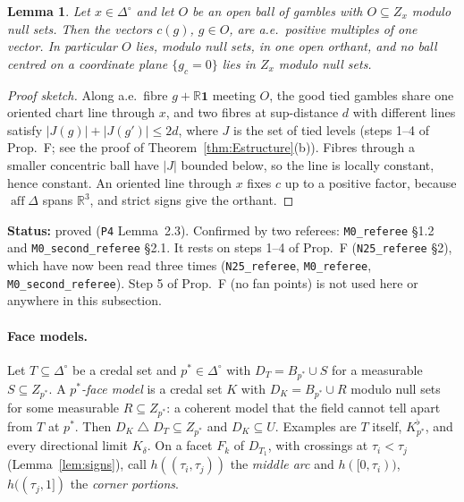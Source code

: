\documentclass[11pt]{article}
\newtheorem{lemma}[theorem]{Lemma}
\theoremstyle{definition}
\theoremstyle{remark}
\newcommand{\R}{\mathbb R}
\newcommand{\one}{\mathbf 1}
\newcommand{\Di}{\Delta^{\circ}}
\newcommand{\aff}{\operatorname{aff}}
\newcommand{\sd}{\mathbin{\triangle}}
\newcommand{\src}[1]{\texttt{#1}}
\newcommand{\status}[1]{\par\smallskip\noindent\textbf{Status:} #1\par\smallskip}
\begin{document}
\begin{lemma}\label{lem:ball}
Let $x\in\Di$ and let $O$ be an open ball of gambles with $O\subseteq Z_x$ modulo null sets. Then the vectors $c(g)$, $g\in O$, are a.e.\ positive multiples of one vector. In particular $O$ lies, modulo null sets, in one open orthant, and no ball centred on a coordinate plane $\{g_c=0\}$ lies in $Z_x$ modulo null sets.
\end{lemma}
\begin{proof}[Proof sketch]
Along a.e.\ fibre $g+\R\one$ meeting $O$, the good tied gambles share one oriented chart line through $x$, and two fibres at sup-distance $d$ with different lines satisfy $|J(g)|+|J(g')|\le2d$, where $J$ is the set of tied levels (steps 1--4 of Prop.~F; see the proof of Theorem~\ref{thm:Estructure}(b)). Fibres through a smaller concentric ball have $|J|$ bounded below, so the line is locally constant, hence constant. An oriented line through $x$ fixes $c$ up to a positive factor, because $\aff\Delta$ spans $\R^3$, and strict signs give the orthant.
\end{proof}
\status{proved (\src{P4} Lemma~2.3). Confirmed by two referees: \src{M0\_referee} \S1.2 and \src{M0\_second\_referee} \S2.1. It rests on steps 1--4 of Prop.~F (\src{N25\_referee} \S2), which have now been read three times (\src{N25\_referee}, \src{M0\_referee}, \src{M0\_second\_referee}). Step 5 of Prop.~F (no fan points) is not used here or anywhere in this subsection.}

\paragraph{Face models.} Let $T\subseteq\Di$ be a credal set and $p^*\in\Di$ with $D_T=B_{p^*}\cup S$ for a measurable $S\subseteq Z_{p^*}$. A \emph{$p^*$-face model} is a credal set $K$ with $D_K=B_{p^*}\cup R$ modulo null sets for some measurable $R\subseteq Z_{p^*}$: a coherent model that the field cannot tell apart from $T$ at $p^*$. Then $D_K\sd D_T\subseteq Z_{p^*}$ and $D_K\subseteq U$. Examples are $T$ itself, $K^\flat_{p^*}$, and every directional limit $K_\delta$. On a facet $F_k$ of $D_{T_1}$, with crossings at $\tau_i<\tau_j$ (Lemma~\ref{lem:signs}), call $h((\tau_i,\tau_j))$ the \emph{middle arc} and $h([0,\tau_i))$, $h((\tau_j,1])$ the \emph{corner portions}.
\end{document}
